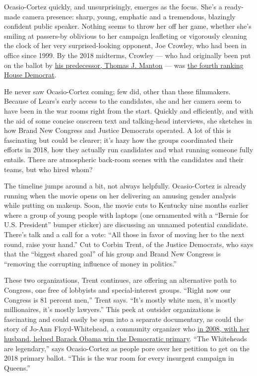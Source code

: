 Ocasio-Cortez quickly, and unsurprisingly, emerges as the focus. She's a
ready-made camera presence: sharp, young, emphatic and a tremendous,
blazingly confident public speaker. Nothing seems to throw her off her
game, whether she's smiling at passers-by oblivious to her campaign
leafleting or vigorously cleaning the clock of her very
surprised-looking opponent, Joe Crowley, who had been in office since
1999. By the 2018 midterms, Crowley --- who had originally been put on
the ballot by
\href{https://www.nytimes.com/1998/07/22/nyregion/manton-plans-to-retire-from-congress-at-end-of-year.html}{his
predecessor, Thomas J. Manton} --- was
\href{Democratic\%20Caucus\%20Chairman\%20of\%20the\%20United\%20States\%20House\%20of\%20Representatives,}{the
fourth ranking House Democrat}.

He never saw Ocasio-Cortez coming; few did, other than these filmmakers.
Because of Lears's early access to the candidates, she and her camera
seem to have been in the war rooms right from the start. Quickly and
efficiently, and with the aid of some concise onscreen text and
talking-head interviews, she sketches in how Brand New Congress and
Justice Democrats operated. A lot of this is fascinating but could be
clearer; it's hazy how the groups coordinated their efforts in 2018, how
they actually run candidates and what running someone fully entails.
There are atmospheric back-room scenes with the candidates and their
teams, but who hired whom?

The timeline jumps around a bit, not always helpfully. Ocasio-Cortez is
already running when the movie opens on her delivering an amusing gender
analysis while putting on makeup. Soon, the movie cuts to Kentucky nine
months earlier where a group of young people with laptops (one
ornamented with a ``Bernie for U.S. President'' bumper sticker) are
discussing an unnamed potential candidate. There's talk and a call for a
vote: ``All those in favor of moving her to the next round, raise your
hand.'' Cut to Corbin Trent, of the Justice Democrats, who says that the
``biggest shared goal'' of his group and Brand New Congress is
``removing the corrupting influence of money in politics.''

These two organizations, Trent continues, are offering an alternative
path to Congress, one free of lobbyists and special-interest groups.
``Right now our Congress is 81 percent men,'' Trent says. ``It's mostly
white men, it's mostly millionaires, it's mostly lawyers.'' This peek at
outsider organizations is fascinating and could easily be spun into a
separate documentary, as could the story of Jo-Ann Floyd-Whitehead, a
community organizer who
\href{https://www.nytimes.com/2009/09/04/nyregion/04race.html}{in 2008,
with her husband, helped Barack Obama win the Democratic primary}. ``The
Whiteheads are legendary,'' says Ocasio-Cortez as people pore over her
petition to get on the 2018 primary ballot. ``This is the war room for
every insurgent campaign in Queens.''

